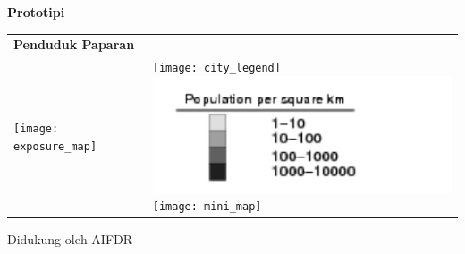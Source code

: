 \documentclass[a4paper]{article}
\begin{document}
\centerline{\Large \textbf{Prototipi}}


\bigskip


\bigskip
\hspace{-5mm} 

\bigskip
\begin{tabular}{@{}l@{}l}
  \Large \textbf{Penduduk Paparan} & \\
  \parbox[t]{0.7\textwidth}{
    \vspace{0pt}
    \texttt{[image: exposure\_map]}} &
  \hspace{-10mm}
  \parbox[t]{0.3\textwidth}{
    \vspace{2mm}
    \texttt{[image: city\_legend]} \\
    \includegraphics{population_legend}\\
    \texttt{[image: mini\_map]}\\
  }
\end{tabular}

\bigskip
\bigskip
\bigskip
\bigskip
\bigskip
\bigskip
\bigskip
\bigskip
\bigskip
\bigskip
\bigskip
\bigskip
\flushright \small Didukung oleh AIFDR %
\end{document}
